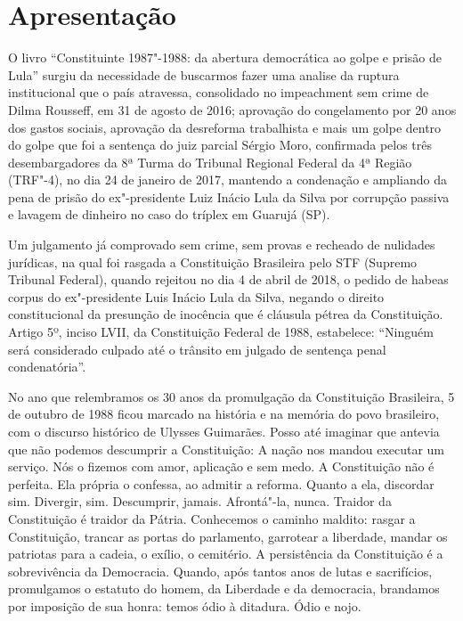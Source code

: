 \chapter{Apresentação}%

O livro “Constituinte 1987"-1988: da abertura democrática ao golpe e prisão de Lula” surgiu da necessidade de buscarmos fazer uma analise da ruptura institucional que o país atravessa, consolidado no impeachment sem crime de Dilma Rousseff, em 31 de agosto de 2016; aprovação do congelamento por 20 anos dos gastos sociais, aprovação da desreforma trabalhista e mais um golpe dentro do golpe que foi a sentença do juiz parcial Sérgio Moro, confirmada pelos três desembargadores da 8ª Turma do Tribunal Regional Federal da 4ª Região (TRF"-4), no dia 24 de janeiro de 2017, mantendo a condenação e ampliando da pena de prisão do ex"-presidente Luiz Inácio Lula da Silva por corrupção passiva e lavagem de dinheiro no caso do tríplex em Guarujá (SP).

Um julgamento já comprovado sem crime, sem provas e recheado de nulidades jurídicas, na qual foi rasgada a Constituição Brasileira pelo STF (Supremo Tribunal Federal), quando rejeitou no dia 4 de abril de 2018, o pedido de habeas corpus do ex"-presidente Luis Inácio Lula da Silva, negando o direito constitucional da presunção de inocência que é cláusula pétrea da Constituição. Artigo 5º, inciso LVII, da Constituição Federal de 1988, estabelece: “Ninguém será considerado culpado até o trânsito em julgado de sentença penal condenatória”.

No ano que relembramos os 30 anos da promulgação da Constituição Brasileira, 5 de outubro de 1988 ficou marcado na história e na memória do povo brasileiro, com o discurso histórico de Ulysses Guimarães. Posso até imaginar que antevia que não podemos descumprir a Constituição: A nação nos mandou executar um serviço. Nós o fizemos com amor, aplicação e sem medo. A Constituição não é perfeita. Ela própria o confessa, ao admitir a reforma. Quanto a ela, discordar sim. Divergir, sim. Descumprir, jamais. Afrontá"-la, nunca. Traidor da Constituição é traidor da Pátria. Conhecemos o caminho maldito: rasgar a Constituição, trancar as portas do parlamento, garrotear a liberdade, mandar os patriotas para a cadeia, o exílio, o cemitério. A persistência da Constituição é a sobrevivência da Democracia. Quando, após tantos anos de lutas e sacrifícios, promulgamos o estatuto do homem, da Liberdade e da democracia, brandamos por imposição de sua honra: temos ódio à ditadura. Ódio e nojo.

